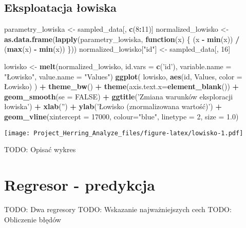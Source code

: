 \documentclass[]{article}
\newenvironment{Shaded}{\begin{snugshade}}{\end{snugshade}}
\newcommand{\ControlFlowTok}[1]{\textcolor[rgb]{0.13,0.29,0.53}{\textbf{#1}}}
\newcommand{\DataTypeTok}[1]{\textcolor[rgb]{0.13,0.29,0.53}{#1}}
\newcommand{\DecValTok}[1]{\textcolor[rgb]{0.00,0.00,0.81}{#1}}
\newcommand{\FloatTok}[1]{\textcolor[rgb]{0.00,0.00,0.81}{#1}}
\newcommand{\KeywordTok}[1]{\textcolor[rgb]{0.13,0.29,0.53}{\textbf{#1}}}
\newcommand{\NormalTok}[1]{#1}
\newcommand{\OperatorTok}[1]{\textcolor[rgb]{0.81,0.36,0.00}{\textbf{#1}}}
\newcommand{\OtherTok}[1]{\textcolor[rgb]{0.56,0.35,0.01}{#1}}
\newcommand{\StringTok}[1]{\textcolor[rgb]{0.31,0.60,0.02}{#1}}
\begin{document}
\hypertarget{eksploatacja-ux142owiska}{%
\subsection{Eksploatacja łowiska}\label{eksploatacja-ux142owiska}}

\begin{Shaded}
\begin{Highlighting}[]
\NormalTok{parametry_lowiska <-}\StringTok{ }\NormalTok{sampled_data[, }\KeywordTok{c}\NormalTok{(}\DecValTok{8}\OperatorTok{:}\DecValTok{11}\NormalTok{)]}
\NormalTok{normalized_lowisko <-}\StringTok{ }\KeywordTok{as.data.frame}\NormalTok{(}\KeywordTok{lapply}\NormalTok{(parametry_lowiska, }\ControlFlowTok{function}\NormalTok{(x) \{}
\NormalTok{  (x }\OperatorTok{-}\StringTok{ }\KeywordTok{min}\NormalTok{(x)) }\OperatorTok{/}\StringTok{ }\NormalTok{(}\KeywordTok{max}\NormalTok{(x) }\OperatorTok{-}\StringTok{ }\KeywordTok{min}\NormalTok{(x))}
\NormalTok{\}))}
\NormalTok{normalized_lowisko[}\StringTok{"id"}\NormalTok{] <-}\StringTok{ }\NormalTok{sampled_data[, }\DecValTok{16}\NormalTok{]}

\NormalTok{lowisko <-}\StringTok{ }\KeywordTok{melt}\NormalTok{(normalized_lowisko, }\DataTypeTok{id.vars =} \KeywordTok{c}\NormalTok{(}\StringTok{'id'}\NormalTok{), }\DataTypeTok{variable.name =} \StringTok{"Łowisko"}\NormalTok{, }\DataTypeTok{value.name =} \StringTok{"Values"}\NormalTok{)}
\KeywordTok{ggplot}\NormalTok{(}
\NormalTok{  lowisko,}
  \KeywordTok{aes}\NormalTok{(id, Values, }\DataTypeTok{color =}\NormalTok{ Łowisko)}
\NormalTok{) }\OperatorTok{+}\StringTok{ }\KeywordTok{theme_bw}\NormalTok{() }\OperatorTok{+}\StringTok{ }
\StringTok{  }\KeywordTok{theme}\NormalTok{(}\DataTypeTok{axis.text.x=}\KeywordTok{element_blank}\NormalTok{()) }\OperatorTok{+}\StringTok{ }\KeywordTok{geom_smooth}\NormalTok{(}\DataTypeTok{se =} \OtherTok{FALSE}\NormalTok{) }\OperatorTok{+}\StringTok{ }\KeywordTok{ggtitle}\NormalTok{(}\StringTok{'Zmiana warunków eksploracji łowiska'}\NormalTok{) }\OperatorTok{+}\StringTok{  }\KeywordTok{xlab}\NormalTok{(}\StringTok{''}\NormalTok{) }\OperatorTok{+}\StringTok{ }\KeywordTok{ylab}\NormalTok{(}\StringTok{'Łowisko (znormalizowana wartość)'}\NormalTok{) }\OperatorTok{+}\StringTok{ }\KeywordTok{geom_vline}\NormalTok{(}\DataTypeTok{xintercept =} \DecValTok{17000}\NormalTok{, }\DataTypeTok{colour=}\StringTok{"blue"}\NormalTok{, }\DataTypeTok{linetype =} \DecValTok{2}\NormalTok{, }\DataTypeTok{size =} \FloatTok{1.0}\NormalTok{)}
\end{Highlighting}
\end{Shaded}

\texttt{[image: Project\_Herring\_Analyze\_files/figure-latex/lowisko-1.pdf]}

TODO: Opisać wykres

\hypertarget{regresor---predykcja}{%
\section{Regresor - predykcja}\label{regresor---predykcja}}

TODO: Dwa regresory TODO: Wskazanie najważniejszych cech TODO:
Obliczenie błędów
\end{document}
